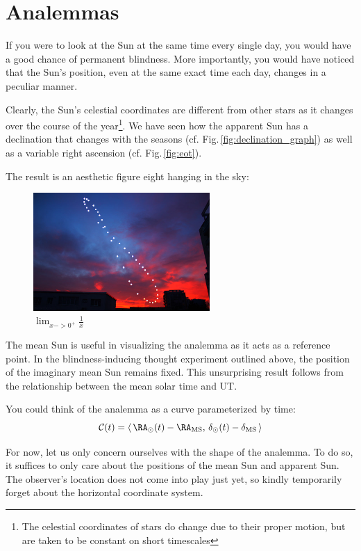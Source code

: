 \section{Analemmas}
If you were to look at the Sun at the same time every single day, you would have a good chance of permanent blindness. More importantly, you would have noticed that the Sun's position, even at the same exact time each day, changes in a peculiar manner.

Clearly, the Sun's celestial coordinates are different from other stars as it changes over the course of the year\footnote{The celestial coordinates of stars do change due to their proper motion, but are taken to be constant on short timescales}. We have seen how the apparent Sun has a declination that changes with the seasons (cf. Fig.\,\ref{fig:declination_graph}) as well as a variable right ascension (cf. Fig.\,\ref{fig:eot}).

The result is an aesthetic figure eight hanging in the sky:
\begin{figure}[h!]
    \centering
    \includegraphics[width=0.6\textwidth]{img/analemma.jpg}
    \caption{$\lim_{x->0^+} \frac{1}{x}$}
\end{figure}

The mean Sun is useful in visualizing the analemma as it acts as a reference point. In the blindness-inducing thought experiment outlined above, the position of the imaginary mean Sun remains fixed. This unsurprising result follows from the relationship between the mean solar time and UT. 

You could think of the analemma as a curve parameterized by time:
\begin{equation}
    \mathcal{C}(t) = \left\langle\, \RA_\odot(t) - \RA_\mathrm{MS}, \, \delta_\odot(t) - \delta_\mathrm{MS} \,\right\rangle
\end{equation}

For now, let us only concern ourselves with the shape of the analemma. To do so, it suffices to only care about the positions of the mean Sun and apparent Sun. The observer's location does not come into play just yet, so kindly temporarily forget about the horizontal coordinate system.

